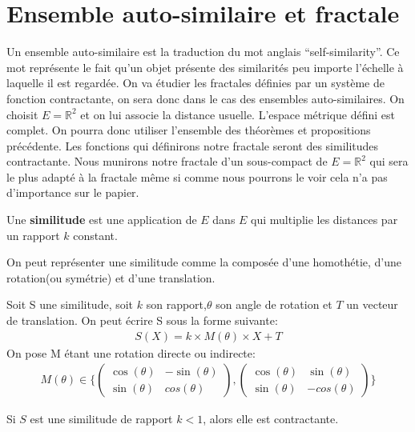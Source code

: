 \documentclass[a4paper, 12pt]{report}
\begin{document}
		\section{Ensemble auto-similaire et fractale}
		\label{FracEns}
			Un ensemble auto-similaire est la traduction du mot anglais ``self-similarity''. Ce mot représente le fait qu'un objet présente des similarités peu importe l'échelle à laquelle il est regardée. On va étudier les fractales définies par un système de fonction contractante, on sera donc dans le cas des ensembles auto-similaires. On choisit $E=\mathds{R}^2$ et on lui associe la distance usuelle. L'espace métrique défini est complet. On pourra donc utiliser l'ensemble des théorèmes et propositions précédente. Les fonctions qui définirons notre fractale seront des similitudes contractante. Nous munirons notre fractale d'un sous-compact de $E=\mathds{R}^2$ qui sera le plus adapté à la fractale même si comme nous pourrons le voir cela n'a pas d'importance sur le papier. 
			\begin{definition}
				Une \textbf{similitude} est une application de $E$ dans $E$ qui multiplie les distances par un rapport $k$ constant.
			\end{definition}
			\begin{remark*}
				On peut représenter une similitude comme la composée d'une homothétie, d'une rotation(ou symétrie) et d'une translation.
			\end{remark*}
			\begin{prop}
				Soit S une similitude, soit $k$ son rapport,$\theta$ son angle de rotation et $T$ un vecteur de translation. On peut écrire S sous la forme suivante:
				\begin{align*}
					S(X)=k\times M(\theta)\times X+T
				\end{align*}
				On pose M étant une rotation directe ou indirecte:
				\begin{align*}
					M(\theta)\in\Bigg\{
					\begin{pmatrix}
						\cos(\theta) & -\sin(\theta) \\
						\sin(\theta) & cos(\theta) 
					\end{pmatrix}
					,
					\begin{pmatrix}
						\cos(\theta) & \sin(\theta) \\
						\sin(\theta) & -cos(\theta) 
					\end{pmatrix}
					\Bigg\}
				\end{align*}
			\end{prop}
			\begin{prop}
				Si $S$ est une similitude de rapport $k<1$, alors elle est contractante.
			\end{prop}
\end{document}
